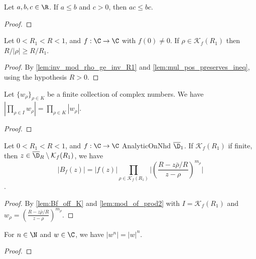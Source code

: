\begin{lemma}\label{lem:mul_pos_preserves_ineq}  \leanok
Let $a, b, c \in \R$. If $a \le b$ and $c > 0$, then $ac \le bc$.
\end{lemma}
\begin{proof} \leanok
\end{proof}

\begin{lemma}\label{lem:R_div_mod_rho_ge_R_div_R1}  \leanok
Let $0<R_1<R<1$, and $f:\C\to\C$ with $f(0)\neq0$. If $\rho\in \mathcal K_f(R_1)$ then $R/|\rho|\ge R/R_1$.
\end{lemma}
\begin{proof} \leanok
{}
By \cref{lem:inv_mod_rho_ge_inv_R1} and \cref{lem:mul_pos_preserves_ineq}, using the hypothesis $R>0$.
\end{proof}


\begin{lemma}\label{lem:mod_of_prod2}  \leanok
Let $\{w_\rho\}_{\rho\in K}$ be a finite collection of complex numbers. We have $|\prod_{\rho\in I} w_\rho| = \prod_{\rho\in K} |w_\rho|$.
\end{lemma}
\begin{proof} \leanok
\end{proof}

\begin{lemma}[B modulus]\label{lem:mod_Bf_is_prod_mod}  \leanok
Let $0<R_1<R<1$, and $f:\C\to\C$ AnalyticOnNhd $\overline{\D}_1$. If $\mathcal K_f(R_1)$ if finite, then $z\in \overline{\D}_R\setminus\mathcal K_f(R_1)$, we have
$$|B_f(z)|=|f(z)|\prod_{\rho\in\mathcal K_f(R_1)}\Big|\left(\frac{R-z\bar\rho/R}{z-\rho}\right)^{m_\rho}\Big|$$.
\end{lemma}
\begin{proof}
\leanok
By \cref{lem:Bf_off_K} and \cref{lem:mod_of_prod2} with $I=\mathcal K_f(R_1)$ and $w_\rho = (\frac{R-z\bar\rho/R}{z-\rho})^{m_\rho}$.
\end{proof}

\begin{lemma}\label{lem:abs_pow}  \leanok
For $n\in\N$ and $w\in\C$, we have $|w^n|=|w|^n$.
\end{lemma}
\begin{proof} \leanok
\end{proof}

